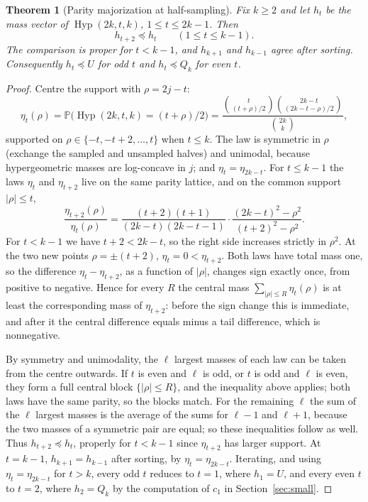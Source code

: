 \documentclass[11pt]{article}
\newtheorem{theorem}{Theorem}[section]
\theoremstyle{remark}
\newcommand{\Prb}{\mathbb P}
\newcommand{\Hyp}{\operatorname{Hyp}}
\begin{document}
\begin{theorem}[Parity majorization at half-sampling]\label{thm:parity}
Fix \(k\ge2\) and let \(h_t\) be the mass vector of \(\Hyp(2k,t,k)\),
\(1\le t\le2k-1\). Then
\[
 h_{t+2}\preceq h_t\qquad(1\le t\le k-1).
\]
The comparison is proper for \(t<k-1\), and \(h_{k+1}\) and \(h_{k-1}\) agree
after sorting. Consequently \(h_t\preceq U\) for odd \(t\) and \(h_t\preceq Q_k\)
for even \(t\).
\end{theorem}
\begin{proof}
Centre the support with \(\rho=2j-t\):
\[
 \eta_t(\rho)=\Prb\bigl(\Hyp(2k,t,k)=(t+\rho)/2\bigr)
 =\frac{\binom{t}{(t+\rho)/2}\binom{2k-t}{(2k-t-\rho)/2}}{\binom{2k}{k}},
\]
supported on \(\rho\in\{-t,-t+2,\ldots,t\}\) when \(t\le k\). The law is
symmetric in \(\rho\) (exchange the sampled and unsampled halves) and unimodal,
because hypergeometric masses are log-concave in \(j\); and \(\eta_t=\eta_{2k-t}\).
For \(t\le k-1\) the laws \(\eta_t\) and \(\eta_{t+2}\) live on the same parity
lattice, and on the common support \(|\rho|\le t\),
\begin{equation}\label{eq:radialratio}
 \frac{\eta_{t+2}(\rho)}{\eta_t(\rho)}
 =\frac{(t+2)(t+1)}{(2k-t)(2k-t-1)}\cdot
   \frac{(2k-t)^2-\rho^2}{(t+2)^2-\rho^2}.
\end{equation}
For \(t<k-1\) we have \(t+2<2k-t\), so the right side increases strictly in
\(\rho^2\). At the two new points \(\rho=\pm(t+2)\), \(\eta_t=0<\eta_{t+2}\).
Both laws have total mass one, so the difference
\(\eta_t-\eta_{t+2}\), as a function of \(|\rho|\), changes sign exactly once,
from positive to negative. Hence for every \(R\) the central mass
\(\sum_{|\rho|\le R}\eta_t(\rho)\) is at least the corresponding mass of
\(\eta_{t+2}\): before the sign change this is immediate, and after it the
central difference equals minus a tail difference, which is nonnegative.

By symmetry and unimodality, the \(\ell\) largest masses of each law can be
taken from the centre outwards. If \(t\) is even and \(\ell\) is odd, or \(t\)
is odd and \(\ell\) is even, they form a full central block
\(\{|\rho|\le R\}\), and the inequality above applies; both laws have the same
parity, so the blocks match. For the remaining \(\ell\) the sum of the \(\ell\) largest masses is the
average of the sums for \(\ell-1\) and \(\ell+1\), because the two masses of a
symmetric pair are equal; so these inequalities follow as well. Thus
\(h_{t+2}\preceq h_t\), properly for \(t<k-1\) since \(\eta_{t+2}\) has larger
support. At \(t=k-1\), \(h_{k+1}=h_{k-1}\) after sorting, by \(\eta_t=\eta_{2k-t}\).
Iterating, and using \(\eta_t=\eta_{2k-t}\) for \(t>k\), every odd \(t\)
reduces to \(t=1\), where \(h_1=U\), and every even \(t\) to \(t=2\), where
\(h_2=Q_k\) by the computation of \(c_1\) in Section~\ref{sec:small}.
\end{proof}
\end{document}
